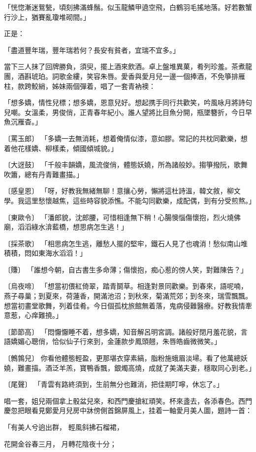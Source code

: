 「恍惚漸迷鴛甃，頃刻拂滿蜂鬚。似玉龍鱗甲遶空飛，白鶴羽毛搖地落。好若數蟹行沙上，猶賽亂瓊堆砌間。」

正是：

「盡道豐年瑞，豐年瑞若何？長安有貧者，宜瑞不宜多。」

當下三人抹了回牌勝負，須臾，擺上酒來飲酒。卓上盤堆異菓，肴列珍羞。茶煮龍團，酒斟琥珀。詞歌金縷，笑容朱唇。愛香與愛月兒一邊一個捧酒，不免箏排雁柱，款跨鮫綃，姊妹兩個彈着，唱了一套青衲襖：

「想多嬌，情性兒標；想多嬌，恩意兒好。想起携手同行共歡笑，吟風咏月將詩句兒嘲。女溫柔，男俊俏，正青春年紀小。誰人望將比目魚分開，瓶墜簪折，今日早魚沉雁杳。」

〔罵玉郎〕 「多嬌一去無消耗，想着俺情似漆，意如膠。常記的共枕同歡樂，想着他花樣嬌、柳樣柔，傾國傾城貌。」

〔大迓鼓〕 「千般丰韻嬌，風流俊俏，體態妖嬈，所為諸般妙。搊箏撥阮，歌舞吹簫，總有丹青難畫描。」

〔感皇恩〕 「呀，好教我無緒無聊！意攘心勞，懶將這杜詩溫，韓文敘，柳文學。我這里愁懷越焦，這些時容貌添憔。不能勾同歡樂，成配偶，到有分受煎熬。」

〔東歐令〕 「潘郎貌，沈郎腰，可惜相逢無下稍！心腸懊惱傷懷抱，烈火燒佛廟，滔滔綠水渰藍橋，想思病怎生逃！」

〔採茶歌〕 「相思病怎生逃，離愁人擺的堅牢，鐵石人見了也魂消！愁似南山堆積積，悶如東海水滔滔！」

〔賺〕 「誰想今朝，自古書生多命薄；傷懷抱，痴心惹的傍人笑，對難陳告？」

〔烏夜啼〕 「想當初偎紅倚翠，踏青鬬草。相逢對景同歡樂。到春來，語呢喃，燕子尋巢；到夏來，荷蓮香，開滿池沼；到秋來，菊滿荒郊；到冬來，瑞雪飄飄。想當初畫堂歌舞，列着佳肴。今日個孤枕旅館無着落，鬼病侵難醫療。好教我情牽意惹，心痒難撓。」

〔節節高〕 「悶懨懨睡不着，想多嬌，知音解呂明宮調。諸般好閉月羞花貌，言語嬌媚心聰俏，恰似仙子行來到，金蓮款步鳳頭翹，朱唇皓齒微微笑。」

〔鷯鶉兒〕 你看他體態輕盈，更那堪衣穿素縞，脂粉施蛾眉淡埽。看了他萬總妖嬈，難畫描。酒泛羊羔，寶鴨香飄，銀燭高燒，成就了美滿夫妻，穩取同心到老。」

〔尾聲〕 「青雲有路終須到，生前無分也難消，把佳期叮嚀，休忘了。」

唱一套，姐兒兩個拿上骰盆兒來，和西門慶搶紅頑笑。杯來盞去，各添春色。西門慶忽把眼看見鄭愛月兒房中牀傍側首錦屏風上，挂着一軸愛月美人圖，題詩一首：

「有美人兮逈出群，  輕風斜拂石榴裙，

花開金谷春三月，  月轉花陰夜十分；

